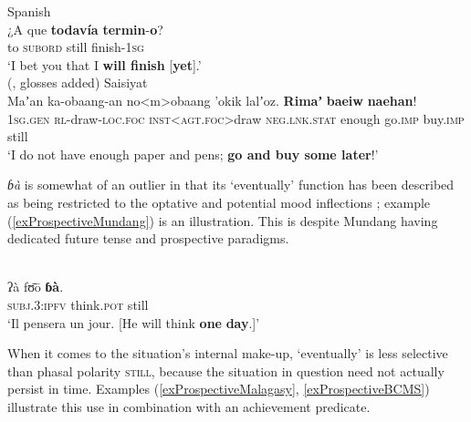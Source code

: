 \begin{exe}
	\ex Spanish\label{exProspectiveSpanishFuturate}\\
	\gll ¿A que \textbf{todavía} \textbf{termin}-\textbf{o}?\\
	\phantom{¿}to \textsc{subord} still finish-1\textsc{sg}\\
	\glt \lq I bet you that I \textbf{will finish} [\textbf{yet}].\rq{}
	\\(\cite[382 fn 30]{Garrido1992}, glosses added)
	\ex Saisiyat\label{exProspectiveSaisiyat}\\
	\gll Maʼan ka-obaang-an no<m>obaang \rq{}okik lalʼoz. \textbf{Rimaʼ} \textbf{baeiw} \textbf{naehan}!\\
	1\textsc{sg}.\textsc{gen} \textsc{rl}-draw-\textsc{loc}.\textsc{foc} \textsc{inst}<\textsc{agt}.\textsc{foc}>draw \textsc{neg}.\textsc{lnk}.\textsc{stat} enough go.\textsc{imp} buy.\textsc{imp} still\\
	\glt \lq I do not have enough paper and pens; \textbf{go and buy some later}!\rq
	\\\parencite[506]{ZeitounEtal2015}
\end{exe}

 \textit{ɓà} is somewhat of an outlier in that its \lq eventually\rq{ }function has been described as being restricted to the optative and potential mood inflections \parencite[382]{Elders2000}; example (\ref{exProspectiveMundang}) is an illustration. This is despite Mundang having dedicated future tense and prospective  paradigms. 
\begin{exe}
	\ex\label{exProspectiveMundang}\\
	\gll ʔà fʊ̄ō \textbf{ɓà}.\\
\textsc{subj}.3:\textsc{ipfv} think.\textsc{pot} still\\
	\glt \lq Il pensera un jour. [He will think \textbf{one} \textbf{day}.]' \parencite[382]{Elders2000}
\end{exe}

When it comes to the situation's internal make-up, \lq eventually\rq{ }is less selective than phasal polarity \textsc{still}, because the situation in question need not actually persist in time. Examples (\ref{exProspectiveMalagasy}, \ref{exProspectiveBCMS}) illustrate this use in combination with an achievement predicate.


